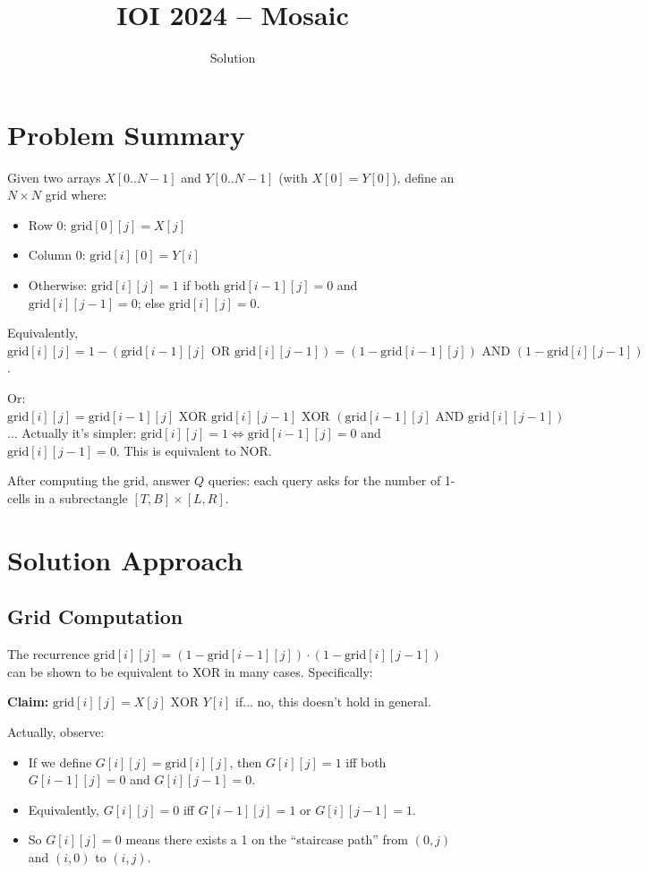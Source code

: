 \documentclass[11pt,a4paper]{article}
\title{IOI 2024 -- Mosaic}
\author{Solution}
\date{}
\begin{document}
\maketitle

\section{Problem Summary}
Given two arrays $X[0..N-1]$ and $Y[0..N-1]$ (with $X[0] = Y[0]$), define an $N \times N$ grid where:
\begin{itemize}
  \item Row 0: $\text{grid}[0][j] = X[j]$
  \item Column 0: $\text{grid}[i][0] = Y[i]$
  \item Otherwise: $\text{grid}[i][j] = 1$ if both $\text{grid}[i-1][j] = 0$ and $\text{grid}[i][j-1] = 0$; else $\text{grid}[i][j] = 0$.
\end{itemize}

Equivalently, $\text{grid}[i][j] = 1 - (\text{grid}[i-1][j] \text{ OR } \text{grid}[i][j-1]) = (1 - \text{grid}[i-1][j]) \text{ AND } (1 - \text{grid}[i][j-1])$.

Or: $\text{grid}[i][j] = \text{grid}[i-1][j] \text{ XOR } \text{grid}[i][j-1] \text{ XOR } (\text{grid}[i-1][j] \text{ AND } \text{grid}[i][j-1])$... Actually it's simpler: $\text{grid}[i][j] = 1 \iff \text{grid}[i-1][j] = 0$ and $\text{grid}[i][j-1] = 0$. This is equivalent to NOR.

After computing the grid, answer $Q$ queries: each query asks for the number of 1-cells in a subrectangle $[T, B] \times [L, R]$.

\section{Solution Approach}

\subsection{Grid Computation}
The recurrence $\text{grid}[i][j] = (1 - \text{grid}[i-1][j]) \cdot (1 - \text{grid}[i][j-1])$ can be shown to be equivalent to XOR in many cases. Specifically:

\textbf{Claim:} $\text{grid}[i][j] = X[j] \text{ XOR } Y[i]$ if... no, this doesn't hold in general.

Actually, observe:
\begin{itemize}
  \item If we define $G[i][j] = \text{grid}[i][j]$, then $G[i][j] = 1$ iff both $G[i-1][j] = 0$ and $G[i][j-1] = 0$.
  \item Equivalently, $G[i][j] = 0$ iff $G[i-1][j] = 1$ or $G[i][j-1] = 1$.
  \item So $G[i][j] = 0$ means there exists a 1 on the ``staircase path'' from $(0,j)$ and $(i,0)$ to $(i,j)$.
\end{itemize}
\end{document}
